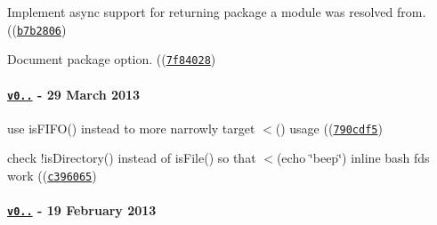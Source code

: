 \begin{DoxyItemize}
\item Implement async support for returning package a module was resolved from. ((\href{https://github.com/browserify/resolve/commit/b7b28069acb7c749a2053dbb0c8d606515954694}{\tt {\ttfamily b7b2806}})
\item Document package option. ((\href{https://github.com/browserify/resolve/commit/7f8402881b725938cfaf1d4835ec2fb6cee4862d}{\tt {\ttfamily 7f84028}})
\end{DoxyItemize}

\paragraph*{\href{https://github.com/browserify/resolve/compare/v0.3.0...v0.3.1}{\tt v0..} -\/ 29 March 2013}


\begin{DoxyItemize}
\item use is\+F\+I\+F\+O() instead to more narrowly target $<$() usage ((\href{https://github.com/browserify/resolve/commit/790cdf5ab7c92bb146e8ace05ba0b26c5f51ffb3}{\tt {\ttfamily 790cdf5}})
\item check !is\+Directory() instead of is\+File() so that $<$(echo \char`\"{}beep\char`\"{}) inline bash fds work ((\href{https://github.com/browserify/resolve/commit/c3960650f1a1417e52238011e08a6da2b0d9fee4}{\tt {\ttfamily c396065}})
\end{DoxyItemize}

\paragraph*{\href{https://github.com/browserify/resolve/compare/v0.2.8...v0.3.0}{\tt v0..} -\/ 19 February 2013}


